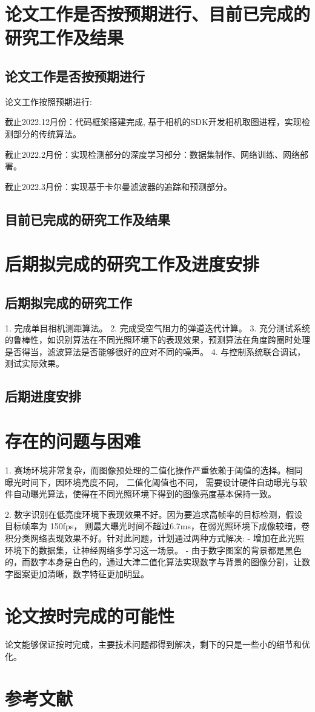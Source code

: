 \section{论文工作是否按预期进行、目前已完成的研究工作及结果}
\subsection{论文工作是否按预期进行}
论文工作按照预期进行: \par
截止2022.12月份：代码框架搭建完成, 基于相机的SDK开发相机取图进程，实现检测部分的传统算法。\par
截止2022.2月份：实现检测部分的深度学习部分：数据集制作、网络训练、网络部署。\par
截止2022.3月份：实现基于卡尔曼滤波器的追踪和预测部分。\par
\subsection{目前已完成的研究工作及结果}
\section{后期拟完成的研究工作及进度安排}
\subsection{后期拟完成的研究工作}
1. 完成单目相机测距算法。
2. 完成受空气阻力的弹道迭代计算。
3. 充分测试系统的鲁棒性，如识别算法在不同光照环境下的表现效果，预测算法在角度跨圈时处理是否得当，滤波算法是否能够很好的应对不同的噪声。
4. 与控制系统联合调试，测试实际效果。
\subsection{后期进度安排}
\section{存在的问题与困难}
1. 赛场环境非常复杂，而图像预处理的二值化操作严重依赖于阈值的选择。相同曝光时间下，因环境亮度不同， 二值化阈值也不同，
需要设计硬件自动曝光与软件自动曝光算法，使得在不同光照环境下得到的图像亮度基本保持一致。\par

2. 数字识别在低亮度环境下表现效果不好。因为要追求高帧率的目标检测，假设目标帧率为 150fps，
则最大曝光时间不超过6.7ms，在弱光照环境下成像较暗，卷积分类网络表现效果不好。针对此问题，计划通过两种方式解决:
- 增加在此光照环境下的数据集，让神经网络多学习这一场景。
- 由于数字图案的背景都是黑色的，而数字本身是白色的，通过大津二值化算法实现数字与背景的图像分割，让数字图案更加清晰，数字特征更加明显。\par
\section{论文按时完成的可能性}
论文能够保证按时完成，主要技术问题都得到解决，剩下的只是一些小的细节和优化。\par
\section{参考文献}



